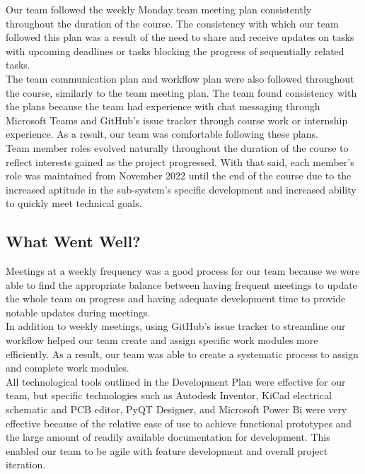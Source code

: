 \documentclass[12pt]{article}
\begin{document}
Our team followed the weekly Monday team meeting plan consistently throughout the duration of the course. The consistency with which our team followed this plan was a result of the need to share and receive updates on tasks with upcoming deadlines or tasks blocking the progress of sequentially related tasks. \\

The team communication plan and workflow plan were also followed throughout the course, similarly to the team meeting plan. The team found consistency with the plans because the team had experience with chat messaging through Microsoft Teams and GitHub's issue tracker through course work or internship experience. As a result, our team was comfortable following these plans. \\

Team member roles evolved naturally throughout the duration of the course to reflect interests gained as the project progressed. With that said, each member's role was maintained from November 2022 until the end of the course due to the increased aptitude in the sub-system's specific development and increased ability to quickly meet technical goals. \\



\subsection{What Went Well?}


Meetings at a weekly frequency was a good process for our team because we were able to find the appropriate balance between having frequent meetings to update the whole team on progress and having adequate development time to provide notable updates during meetings. \\

In addition to weekly meetings, using GitHub's issue tracker to streamline our workflow helped our team create and assign specific work modules more efficiently. As a result, our team was able to create a systematic process to assign and complete work modules. \\

All technological tools outlined in the Development Plan were effective for our team, but specific technologies such as Autodesk Inventor, KiCad electrical schematic and PCB editor, PyQT Designer, and Microsoft Power Bi were very effective because of the relative ease of use to achieve functional prototypes and the large amount of readily available documentation for development. This enabled our team to be agile with feature development and overall project iteration. 
\end{document}
